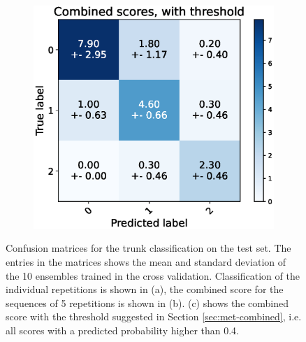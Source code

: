 \begin{figure}
  \begin{subfigure}[t]{0.48\textwidth}
      \includegraphics[width=\textwidth]{files/figs/res/trunk/cnf-combined-th.eps}
      \caption{}
      \label{fig:trunk-cnf-comb-th}
  \end{subfigure}
  \caption{Confusion matrices for the trunk classification on the test set. The entries in the matrices shows the mean and standard deviation of the 10 ensembles trained in the cross validation. Classification of the individual repetitions is shown in (a), the combined score for the sequences of 5 repetitions is shown in (b). (c) shows the combined score with the threshold suggested in Section \ref{sec:met-combined}, i.e. all scores with a predicted probability higher than 0.4.}
  \label{fig:trunk-cnfs}
\end{figure}



